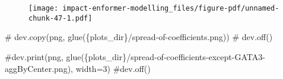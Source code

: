 \documentclass[
  letterpaper,
  DIV=11,
  numbers=noendperiod]{scrartcl}
\newenvironment{Shaded}{\begin{snugshade}}{\end{snugshade}}
\newcommand{\CommentTok}[1]{\textcolor[rgb]{0.37,0.37,0.37}{#1}}
\begin{document}
\begin{figure}[H]

{\centering \texttt{[image: impact-enformer-modelling\_files/figure-pdf/unnamed-chunk-47-1.pdf]}

}

\end{figure}

\begin{Shaded}
\begin{Highlighting}[]
\CommentTok{\# dev.copy(png, glue(\textquotesingle{}\{plots\_dir\}/spread{-}of{-}coefficients.png\textquotesingle{}))}
\CommentTok{\# dev.off()}
\end{Highlighting}
\end{Shaded}

\begin{Shaded}
\begin{Highlighting}[]
\CommentTok{\#dev.print(png, glue(\textquotesingle{}\{plots\_dir\}/spread{-}of{-}coefficients{-}except{-}GATA3{-}aggByCenter.png\textquotesingle{}), width=3)}
\CommentTok{\#dev.off()}
\end{Highlighting}
\end{Shaded}
\end{document}
